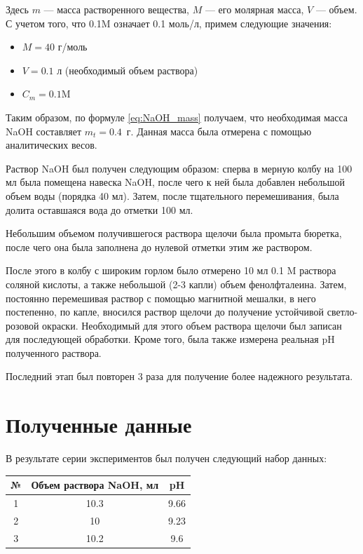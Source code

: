 \documentclass[a4paper, 12pt]{article}
\begin{document}
Здесь $m$ --- масса растворенного вещества, $M$ --- его молярная масса, $V$ --- объем. С учетом того, что 0.1M означает 0.1 моль/л, примем следующие значения:

\begin{itemize}
	\item $M = 40$ г/моль 
	
	\item $V = 0.1$ л (необходимый объем раствора)
	
	\item $C_m = 0.1 \text{M}$
\end{itemize}

Таким образом, по формуле \ref{eq:NaOH_mass} получаем, что необходимая масса NaOH составляет $m_t = 0.4$~г. Данная масса была отмерена с помощью аналитических весов.

Раствор NaOH был получен следующим образом: сперва в мерную колбу на 100 мл была помещена навеска NaOH, после чего к ней была добавлен небольшой объем воды (порядка 40 мл). Затем, после тщательного перемешивания, была долита оставшаяся вода до отметки 100 мл.

Небольшим объемом получившегося раствора щелочи была промыта бюретка, после чего она была заполнена до нулевой отметки этим же раствором.

После этого в колбу с широким горлом было отмерено 10 мл 0.1 M раствора соляной кислоты, а также небольшой (2-3 капли) объем фенолфталеина. Затем, постоянно перемешивая раствор с помощью магнитной мешалки, в него постепенно, по капле, вносился раствор щелочи до получение устойчивой светло-розовой окраски. Необходимый для этого объем раствора щелочи был записан для последующей обработки. Кроме того, была также измерена реальная pH полученного раствора.

Последний этап был повторен 3 раза для получение более надежного результата.

\section{Полученные данные}

В результате серии экспериментов был получен следующий набор данных:

\begin{center}
	
	\begin{tabular}{|c|c|c|}
		\hline
		№ & Объем раствора NaOH, мл & pH \\
		\hline
		1 & 10.3 & 9.66  \\
		\hline
		2 & 10 & 9.23 \\
		\hline
		3 & 10.2 & 9.6 \\
		\hline
	\end{tabular}

\end{center}
\end{document}

